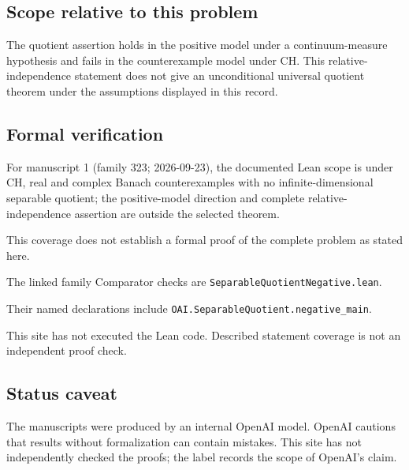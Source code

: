 \documentclass[11pt]{article}
\begin{document}
\subsection{Scope relative to this problem}
The quotient assertion holds in the positive model under a continuum-measure hypothesis and fails in the counterexample model under CH. This relative-independence statement does not give an unconditional universal quotient theorem under the assumptions displayed in this record.

\subsection{Formal verification}
For manuscript 1 (family 323; 2026-09-23), the documented Lean scope is under CH, real and complex Banach counterexamples with no infinite-dimensional separable quotient; the positive-model direction and complete relative-independence assertion are outside the selected theorem.

This coverage does not establish a formal proof of the complete problem as stated here.

The linked family Comparator checks are \texttt{SeparableQuotientNegative.lean}.

Their named declarations include \texttt{OAI.SeparableQuotient.negative\_main}.

This site has not executed the Lean code. Described statement coverage is not an independent proof check.

\subsection{Status caveat}
The manuscripts were produced by an internal OpenAI model. OpenAI cautions that results without formalization can contain mistakes. This site has not independently checked the proofs; the label records the scope of OpenAI's claim.
\end{document}
